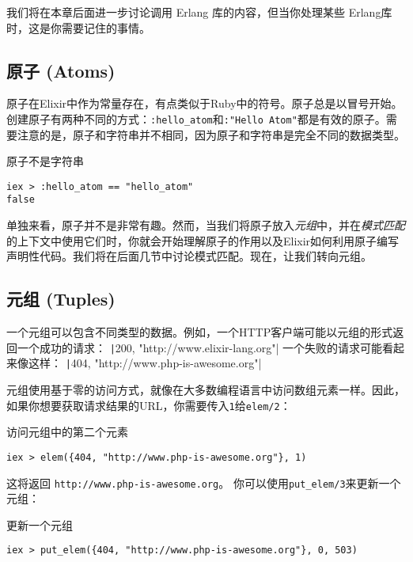 我们将在本章后面进一步讨论调用 Erlang 库的内容，但当你处理某些 Erlang库时，这是你需要记住的事情。

 \subsection{原子 (Atoms)}

原子在Elixir中作为常量存在，有点类似于Ruby中的符号。原子总是以冒号开始。创建原子有两种不同的方式：\texttt{:hello\_atom}和\texttt{:"Hello Atom"}都是有效的原子。需要注意的是，原子和字符串并不相同，因为原子和字符串是完全不同的数据类型。

\begin{code}{原子不是字符串}
\begin{verbatim}
iex > :hello_atom == "hello_atom"
false
\end{verbatim}
\label{lst:atoms_are_not_strings}
\end{code}

单独来看，原子并不是非常有趣。然而，当我们将原子放入\emph{元组}中，并在\emph{模式匹配}的上下文中使用它们时，你就会开始理解原子的作用以及Elixir如何利用原子编写声明性代码。我们将在后面几节中讨论模式匹配。现在，让我们转向元组。

 \subsection{元组 (Tuples)}

一个元组可以包含不同类型的数据。例如，一个HTTP客户端可能以元组的形式返回一个成功的请求：
\texttt|{200, "http://www.elixir-lang.org"}|
一个失败的请求可能看起来像这样：
\texttt|{404, "http://www.php-is-awesome.org"}|

元组使用基于零的访问方式，就像在大多数编程语言中访问数组元素一样。因此，如果你想要获取请求结果的URL，你需要传入\texttt{1}给\texttt{elem/2}：

\begin{code}{访问元组中的第二个元素}
\begin{verbatim}
iex > elem({404, "http://www.php-is-awesome.org"}, 1)
\end{verbatim}
\label{lst:accessing_the_second_element_of_a_tuple}
\end{code}

这将返回 \texttt{http://www.php-is-awesome.org}。
你可以使用\texttt{put\_elem/3}来更新一个元组：

\begin{code}{更新一个元组}
\begin{verbatim}
iex > put_elem({404, "http://www.php-is-awesome.org"}, 0, 503)
\end{verbatim}
\label{lst:update_a_tuple}
\end{code}

